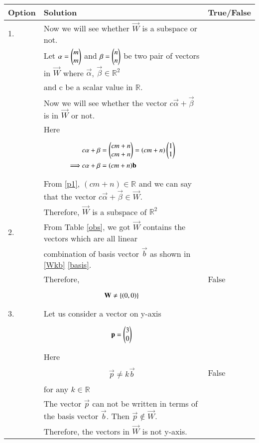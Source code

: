 \documentclass[journal,12pt]{IEEEtran}
\begin{document}
\begin{longtable}{|l|l|l|}
\hline
\endhead
\textbf{Option}&\textbf{Solution}&\textbf{True/False}\\
\hline
1.&Now we will see whether $\vec{W}$ is a subspace or not.&\\&Let $\mathbf{\alpha}=\begin{pmatrix}m\\m\end{pmatrix}$ and $\mathbf{\beta}=\begin{pmatrix}n\\n\end{pmatrix}$ be two pair of vectors in $\vec{W}$ where $\vec{\alpha}$, $\vec{\beta}\in\mathbb{R}^2$&\\& and c be a scalar value in $\mathbb{R}$.&\\&Now we will see whether the vector $c\vec{\alpha}+\vec{\beta}$ is in $\vec{W}$ or not.&\\
&Here&\\&\parbox{13cm}{\begin{align}
    &c\mathbf{\alpha}+\mathbf{\beta}=\begin{pmatrix}cm+n\\cm+n\end{pmatrix}=(cm+n)\begin{pmatrix}1\\1\end{pmatrix}\\
    \implies &c\mathbf{\alpha}+\mathbf{\beta}=(cm+n)\mathbf{b}\label{p1}
\end{align}}&\\&From \eqref{p1}, $(cm+n)\in\mathbb{R}$ and we can say that the vector $c\vec{\alpha}+\vec{\beta}\in\vec{W}$.&\\&Therefore, $\vec{W}$ is a subspace of $\mathbb{R}^2$&\\
.&From Table \ref{obs}, we got $\vec{W}$ contains the vectors which are all linear &\\&combination of basis vector $\vec{b}$ as shown in \eqref{Wkb} \eqref{basis}.&\\&Therefore,&False\\&\parbox{13cm}{\begin{align}
    \mathbf{W}\neq\left\{(0,0)\right\}
\end{align}}&\\
.&Let us consider a vector on y-axis&\\&\parbox{13cm}{\begin{align}
    \mathbf{p}=\begin{pmatrix}3\\0\end{pmatrix}
\end{align}}&\\&Here&\\&\parbox{13cm}{\begin{align}
    \vec{p}\neq k\vec{b}
\end{align}}&False\\&for any $k\in\mathbb{R}$&\\&The vector $\vec{p}$ can not be written in terms of the basis vector $\vec{b}$. Then $\vec{p}\not\in\vec{W}.$&\\&Therefore, the vectors in $\vec{W}$ is not y-axis.&\\

\end{longtable}
\end{document}
